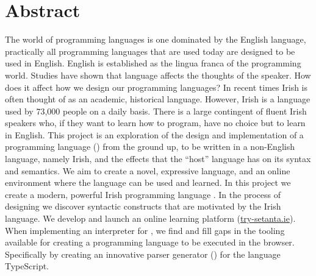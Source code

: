 \chapter{Abstract}
The world of programming languages is one dominated by the English language, practically all programming languages that are used today are designed to be used in English. English is established as the lingua franca of the programming world.
Studies have shown that language affects the thoughts of the speaker\cite{languagecolour}. How does it affect how we design our programming languages?
In recent times Irish is often thought of as an academic, historical language. However, Irish is a language used by 73,000 people on a daily basis. There is a large contingent of fluent Irish speakers who, if they want to learn how to program, have no choice but to learn in English.
This project is an exploration of the design and implementation of a programming language (\Setanta{}) from the ground up, to be written in a non-English language, namely Irish, and the effects that the ``host'' language has on its syntax and semantics. We aim to create a novel, expressive language, and an online environment where the language can be used and learned.
In this project we create a modern, powerful Irish programming language \Setanta{}. In the process of designing \Setanta{} we discover syntactic constructs that are motivated by the Irish language. We develop and launch an online learning platform (\href{https://try-setanta.ie}{try-setanta.ie}). When implementing an interpreter for \Setanta{}, we find and fill gaps in the tooling available for creating a programming language to be executed in the browser. Specifically by creating an innovative parser generator (\tsPEG{}) for the language TypeScript.
